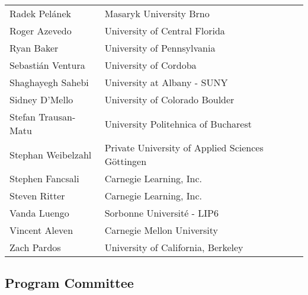 \documentclass[letterpaper,11pt,oneside]{book} %
\newcommand{\nocontentsline}[3]{}
\newcommand{\tocless}[2]{\bgroup\let\addcontentsline=\nocontentsline#1{#2}\egroup}
\begin{document}
\begin{longtable}[]{@{}ll@{}}
Radek Pelánek & Masaryk University Brno \\
Roger Azevedo & University of Central Florida \\
Ryan Baker & University of Pennsylvania \\
Sebastián Ventura & University of Cordoba \\
Shaghayegh Sahebi & University at Albany - SUNY \\
Sidney D'Mello & University of Colorado Boulder \\
Stefan Trausan-Matu & University Politehnica of Bucharest \\
Stephan Weibelzahl & Private University of Applied Sciences Göttingen \\
Stephen Fancsali & Carnegie Learning, Inc. \\
Steven Ritter & Carnegie Learning, Inc. \\
Vanda Luengo & Sorbonne Université - LIP6 \\
Vincent Aleven & Carnegie Mellon University \\
Zach Pardos & University of California, Berkeley \\
\end{longtable}

\tocless\subsection{Program Committee}%
\end{document}
